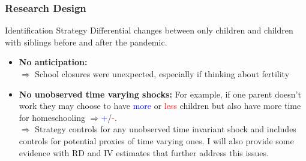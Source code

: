 \documentclass{beamer}
\begin{document}
\begin{frame}
    \label{frame:research}
    \frametitle{Research Design}
    
    \begin{block}{Identification Strategy}
    Differential changes between only children and children with siblings before and after the pandemic.
    \end{block}
    
    \begin{itemize}
         \item<2-> \textbf{No anticipation:} \\
         $\Rightarrow$ School closures were unexpected, especially if thinking about fertility
         \item<3-> \textbf{No unobserved time varying shocks:} For example, if one parent doesn't work they may choose to have \textcolor{blue}{more} or \textcolor{red}{less} children but also have more time for homeschooling $\Rightarrow$\textcolor{blue}{+}/\textcolor{red}{-}. \\
         $\Rightarrow$ Strategy controls for any unobserved time invariant shock and includes controls for potential proxies of time varying ones. I will also provide some evidence with RD and IV estimates that further address this issues.
    \end{itemize}
    
    
\end{frame}
\end{document}
